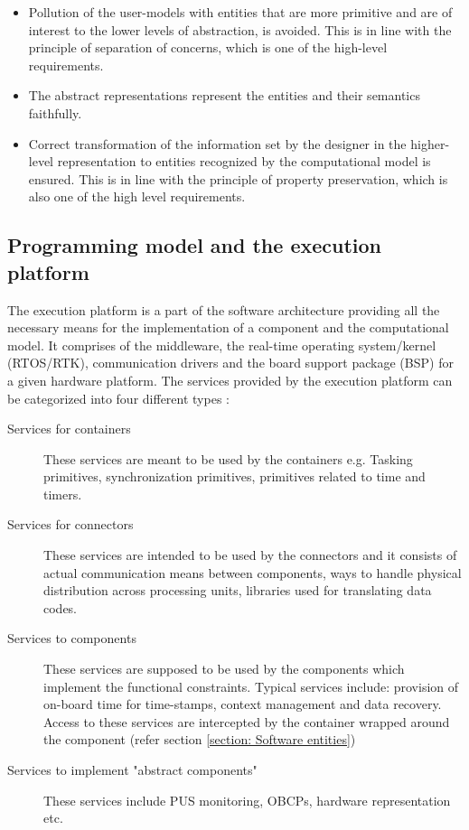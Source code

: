 \begin{itemize}
\item Pollution of the user-models with entities that are more primitive and are of interest to the lower levels of abstraction, is avoided. This is in line with the principle of separation of concerns, which is one of the high-level requirements.

\item The abstract representations represent the entities and their semantics faithfully.

\item Correct transformation of the information set by the designer in the higher-level representation to entities recognized by the computational model is ensured. This is in line with the principle of property preservation, which is also one of the high level requirements. 
\end{itemize} 

\subsection{Programming model and the execution platform}
\label{section: Execution platform}
The execution platform is a part of the software architecture providing all the necessary means for the implementation of a component and the computational model. It comprises of the middleware, the real-time operating system/kernel (RTOS/RTK), communication drivers and the board support package (BSP) for a given hardware platform. The services provided by the execution platform can be categorized into four different types \cite{SAVOIR}:

\begin{description}
\item [Services for containers] These services are meant to be used by the containers e.g. Tasking primitives, synchronization primitives, primitives related to time and timers.

\item [Services for connectors] These services are intended to be used by the connectors and it consists of actual communication means between components, ways to handle physical distribution across processing units, libraries used for translating data codes.

\item [Services to components] These services are supposed to be used by the components which implement the functional constraints. Typical services include: provision of on-board time for time-stamps, context management and data recovery. Access to these services are intercepted by the container wrapped around the component (refer section \cref{section: Software entities})

\item [Services to implement "abstract components"] These services include PUS monitoring, OBCPs, hardware representation etc.
\end{description}

